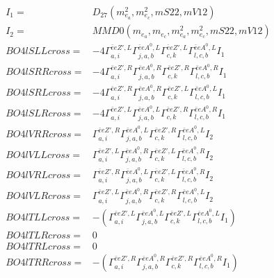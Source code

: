 \documentclass[A4,landscape]{article}
\begin{document}
\begin{align} 
I_1 = & D_{27}(m^2_{e_{{a}}}, m^2_{e_{{c}}}, mS22, mV12) \\ 
I_2 = & MMD0(m_{e_{{a}}}, m_{e_{{c}}}, m^2_{e_{{a}}}, m^2_{e_{{c}}}, mS22, mV12) \\ 
  BO4lSLLcross= & -4  \Gamma^{\bar{e}e {Z'} ,L}_{a, i} \Gamma^{\bar{e}e A^0 ,L}_{j, a, b} \Gamma^{\bar{e}e {Z'} ,L}_{c, k} \Gamma^{\bar{e}e A^0 ,L}_{l, c, b} I_1 \\ 
  BO4lSRRcross= & -4  \Gamma^{\bar{e}e {Z'} ,R}_{a, i} \Gamma^{\bar{e}e A^0 ,R}_{j, a, b} \Gamma^{\bar{e}e {Z'} ,R}_{c, k} \Gamma^{\bar{e}e A^0 ,R}_{l, c, b} I_1 \\ 
  BO4lSRLcross= & -4  \Gamma^{\bar{e}e {Z'} ,R}_{a, i} \Gamma^{\bar{e}e A^0 ,R}_{j, a, b} \Gamma^{\bar{e}e {Z'} ,L}_{c, k} \Gamma^{\bar{e}e A^0 ,L}_{l, c, b} I_1 \\ 
  BO4lSLRcross= & -4  \Gamma^{\bar{e}e {Z'} ,L}_{a, i} \Gamma^{\bar{e}e A^0 ,L}_{j, a, b} \Gamma^{\bar{e}e {Z'} ,R}_{c, k} \Gamma^{\bar{e}e A^0 ,R}_{l, c, b} I_1 \\ 
  BO4lVRRcross= &  \Gamma^{\bar{e}e {Z'} ,R}_{a, i} \Gamma^{\bar{e}e A^0 ,L}_{j, a, b} \Gamma^{\bar{e}e {Z'} ,R}_{c, k} \Gamma^{\bar{e}e A^0 ,L}_{l, c, b} I_2 \\ 
  BO4lVLLcross= &  \Gamma^{\bar{e}e {Z'} ,L}_{a, i} \Gamma^{\bar{e}e A^0 ,R}_{j, a, b} \Gamma^{\bar{e}e {Z'} ,L}_{c, k} \Gamma^{\bar{e}e A^0 ,R}_{l, c, b} I_2 \\ 
  BO4lVRLcross= &  \Gamma^{\bar{e}e {Z'} ,R}_{a, i} \Gamma^{\bar{e}e A^0 ,L}_{j, a, b} \Gamma^{\bar{e}e {Z'} ,L}_{c, k} \Gamma^{\bar{e}e A^0 ,R}_{l, c, b} I_2 \\ 
  BO4lVLRcross= &  \Gamma^{\bar{e}e {Z'} ,L}_{a, i} \Gamma^{\bar{e}e A^0 ,R}_{j, a, b} \Gamma^{\bar{e}e {Z'} ,R}_{c, k} \Gamma^{\bar{e}e A^0 ,L}_{l, c, b} I_2 \\ 
  BO4lTLLcross= & -( \Gamma^{\bar{e}e {Z'} ,L}_{a, i} \Gamma^{\bar{e}e A^0 ,L}_{j, a, b} \Gamma^{\bar{e}e {Z'} ,L}_{c, k} \Gamma^{\bar{e}e A^0 ,L}_{l, c, b} I_1) \\ 
  BO4lTLRcross= & 0 \\ 
  BO4lTRLcross= & 0 \\ 
  BO4lTRRcross= & -( \Gamma^{\bar{e}e {Z'} ,R}_{a, i} \Gamma^{\bar{e}e A^0 ,R}_{j, a, b} \Gamma^{\bar{e}e {Z'} ,R}_{c, k} \Gamma^{\bar{e}e A^0 ,R}_{l, c, b} I_1) \\ 
\end{align} 
\end{document}
